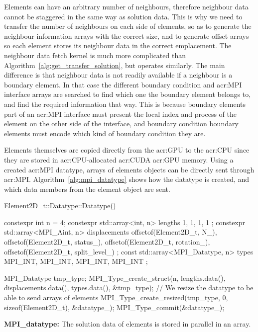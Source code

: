 Elements can have an arbitrary number of neighbours, therefore neighbour data cannot be staggered in
the same way as solution data. This is why we need to transfer the number of neighbours on each side
of elements, so as to generate the neighbour information arrays with the correct size, and to
generate offset arrays so each element stores its neighbour data in the correct emplacement. The
neighbour data fetch kernel is much more complicated than Algorithm~\ref{alg:get_transfer_solution},
but operates similarly. The main difference is that neighbour data is not readily available if a
neighbour is a boundary element. In that case the different boundary condition and
\acrshort{acr:MPI} interface arrays are searched to find which one the boundary element belongs to,
and find the required information that way. This is because boundary elements part of an
\acrshort{acr:MPI} interface must present the local index and process of the element on the other
side of the interface, and boundary condition boundary elements must encode which kind of boundary
condition they are.

Elements themselves are copied directly from the \acrshort{acr:GPU} to the \acrshort{acr:CPU} since
they are stored in \acrshort{acr:CPU}-allocated \acrshort{acr:CUDA} \acrshort{acr:GPU} memory. Using
a created \acrshort{acr:MPI} datatype, arrays of elements objects can be directly sent through
\acrshort{acr:MPI}. Algorithm~\ref{alg:mpi_datatype} shows how the datatype is created, and which
data members from the element object are sent.

\begin{algorithm}[H]
    \begin{cuda}
        Element2D_t::Datatype::Datatype() {
            constexpr int n = 4;
            constexpr std::array<int, n> lengths {
                1, 
                1, 
                1, 
                1
            };
            constexpr std::array<MPI_Aint, n> displacements {
                offsetof(Element2D_t, N_), 
                offsetof(Element2D_t, status_), 
                offsetof(Element2D_t, rotation_), 
                offsetof(Element2D_t, split_level_)
            };
            const std::array<MPI_Datatype, n> types {
                MPI_INT, 
                MPI_INT, 
                MPI_INT, 
                MPI_INT
            };

            MPI_Datatype tmp_type;
            MPI_Type_create_struct(n, lengths.data(), 
                displacements.data(), types.data(), &tmp_type);
            // We resize the datatype to be able to send arrays of elements
            MPI_Type_create_resized(tmp_type, 0, sizeof(Element2D_t), &datatype_);
            MPI_Type_commit(&datatype_);
        }\end{cuda}
\caption{\textbf{MPI\_datatype:} The solution data of elements is stored in parallel in an array.}\label{alg:mpi_datatype}
\end{algorithm}

